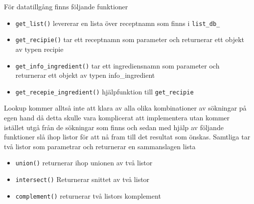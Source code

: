 För datatillgång finns följande funktioner

\begin{itemize}
\item   \verb+get_list()+ levererar en lista över receptnamn som finns i \verb+list_db_+

\item   \verb+get_recipie()+ tar ett receptnamn som parameter och returnerar ett 
        objekt av typen recipie

\item   \verb+get_info_ingredient()+ tar ett ingrediensnamn som parameter och returnerar 
        ett objekt av typen info\_ingredient

\item   \verb+get_recepie_ingredient()+ hjälpfunktion till \verb+get_recipie+
\end{itemize}

Lookup kommer alltså inte att klara av alla olika kombinationer av
sökningar på egen hand då detta skulle vara komplicerat att implementera utan
kommer istället utgå från de sökningar som finns och sedan med hjälp
av följande funktioner slå ihop listor för att nå fram till det
resultat som önskas. Samtliga tar två listor som parametrar och
returnerar en sammanslagen lista

\begin{itemize}
\item   \verb+union()+ returnerar ihop unionen av två listor
\item   \verb+intersect()+ Returnerar snittet av två listor
\item   \verb+complement()+ returnerar två listors komplement
\end{itemize}

    

